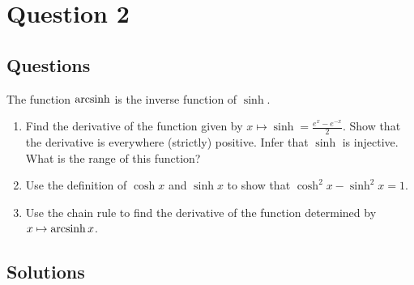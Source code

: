 \chapter{Question 2}
\section{Questions}
The function $\operatorname{arcsinh}$ is the inverse function of $\sinh$.

\begin{enumerate}
  \item Find the derivative of the function given by
  $x \mapsto \sinh = \frac{e^x - e^{-x}}{2}$. Show that the derivative is
  everywhere (strictly) positive. Infer that $\sinh$ is injective. What is the
  range of this function?
  \item Use the definition of $\cosh x$ and $\sinh x$ to show that
  $\cosh^2 x - \sinh^2 x = 1$.
  \item Use the chain rule to find the derivative of the function determined by
  $x \mapsto \operatorname{arcsinh} x$.
\end{enumerate}

\section{Solutions}
